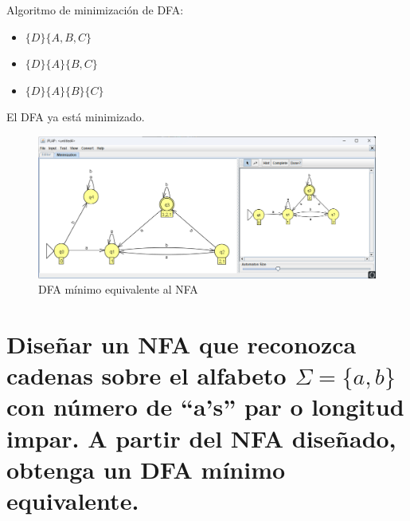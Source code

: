 \documentclass[11pt]{report}
\begin{document}
Algoritmo de minimización de DFA:
\begin{itemize}
  \item $\{D\} \{A, B, C\}$
  \item $\{D\} \{A\} \{B, C\}$
  \item $\{D\} \{A\} \{B\} \{C\}$
\end{itemize}

El DFA ya está minimizado.

\begin{figure}[H]
  \centering
  \includegraphics[scale=0.4]{img/DFA_to_DFA_minimized_04.png}
  \caption{DFA mínimo equivalente al NFA}
\end{figure}

\newpage

\section{Diseñar un NFA que reconozca cadenas sobre el alfabeto $\Sigma = \{a, b\}$ con número de “a's” par o longitud impar. A partir del NFA diseñado, obtenga un DFA mínimo equivalente.}

\newpage
\end{document}
